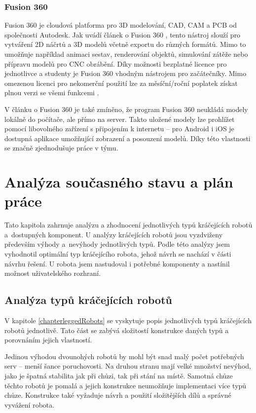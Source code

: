 \subsection*{Fusion 360}
Fusion 360 je cloudová platforma pro 3D modelování, CAD, CAM a PCB od společnosti Autodesk. Jak uvádí článek o Fusion 360 \cite{fusionAll3DP}, tento nástroj slouží pro vytváření 2D náčrtů a 3D modelů včetně exportu do různých formátů. Mimo to umožňuje například animaci sestav, renderování objektů, simulování zátěže nebo přípravu modelů pro CNC obrábění. Díky možnosti bezplatné licence pro jednotlivce a studenty je Fusion 360 vhodným nástrojem pro začátečníky. Mimo omezenou licenci pro nekomerční použití lze za měsíční/roční poplatek získat plnou verzi se všemi funkcemi \cite{fusion}.

V článku o Fusion 360 \cite{fusionAll3DP} je také zmíněno, že program Fusion 360 neukládá modely lokálně do počítače, ale přímo na server. Takto uložené modely lze prohlížet pomocí libovolného zařízení s připojením k internetu -- pro Android i iOS je dostupná aplikace umožňující zobrazení a posouzení modelů. Díky této vlastnosti se značně zjednodušuje práce v týmu.






\chapter{Analýza současného stavu a plán práce}
\label{chapteranalysis}
Tato kapitola zahrnuje analýzu a zhodnocení jednotlivých typů kráčejících robotů a~dostupných komponent. U analýzy kráčejících robotů jsou vyzdviženy především výhody a~nevýhody jednotlivých typů. Podle této analýzy jsem vyhodnotil optimální typ kráčejícího robota, jehož návrh se nachází v části návrhu řešení. U robota jsem nastudoval i potřebné komponenty a nastínil možnost uživatelského rozhraní.


\section{Analýza typů kráčejících robotů}
V kapitole \ref{chapterleggedRobots} se vyskytuje popis jednotlivých typů kráčejících robotů jednotlivě. Tato část se zabývá složitostí konstrukce daných typů a porovnáním jejich vlastností.

Jedinou výhodou dvounohých robotů by mohl být snad malý počet potřebných serv -- menší šance poruchovosti. Na druhou stranu mají velké množství nevýhod, jako je špatná stabilita jak při chůzi, tak při stání na místě. Samotná chůze těchto robotů je pomalá a jejich konstrukce neumožňuje implementaci více typů chůze. Konstrukce také vyžaduje návrh a použití složitějších dílů a správné vyvážení robota.

